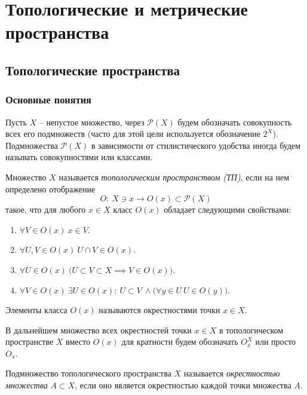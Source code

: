\chapter{Топологические и метрические пространства}



\section{Топологические пространства}

\subsection{Основные понятия}

Пусть $X$ -- непустое множество, через $\mathcal{P}(X)$ будем обозначать совокупность всех его подмножеств (часто для этой цели используется обозначение $2^X$). Подмножества $\mathcal{P}(X)$ в зависимости от стилистического удобства иногда будем называть совокупностями или классами.

\begin{definition}
	Множество $X$ называется \emph{топологическим пространством (ТП)}, если на нем определено отображение
	\[
		O: \ X \ni x \rightarrow O(x) \subset \mathcal{P}(X)
	\]
	такое, что для любого $x \in X$ класс $O(x)$ обладает следующими свойствами:
	\begin{enumerate}
		\item $\forall V \in O(x) \ x \in V$.
		\item $\forall U,V \in O(x) \ U \cap V \in O(x)$.
		\item $\forall  U \in O(x) \ \big(U \subset V \subset X \implies V \in O(x)\big)$.
		\item $\forall V \in O(x) \ \exists U \in O(x): \ U \subset V \ \land \big(\forall y \in U \ U \in O(y)\big)$.
	\end{enumerate}

	Элементы класса $O(x)$ называются окрестностями точки $x \in X$.
\end{definition}

\begin{remark}
	В дальнейшем множество всех окрестностей точки $x \in X$ в топологическом пространстве $X$ вместо $O(x)$ для кратности будем обозначать $O_{x}^{X} $ или просто $O_x$.
\end{remark}

\begin{definition}
	Подмножество топологического пространства $X$ называется \emph{окрестностью множества} $A \subset X$, если оно является окрестностью каждой точки множества $A$.
\end{definition}

